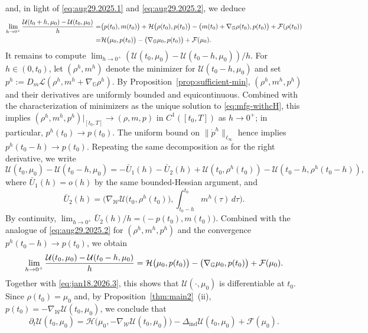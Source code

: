 \documentclass[10pt]{article}
\numberwithin{equation}{section}
\newcommand{\cF}{ \mathcal{F}}
\newcommand{\cH}{ \mathcal{H}}
\newcommand{\cL}{ \mathcal{L}}
\newcommand{\cU}{ \mathcal{U}}
\newcommand{\cW}{ \mathcal{W}}
\newcommand{\bG}{\mathbb G}
\def\cH{\mathcal{H}}
\def\cL{\mathcal{L}}
\begin{document}
and, in light of \eqref{eq:aug29.2025.1} and \eqref{eq:aug29.2025.2}, we deduce
\begin{align}\label{eq:jan18.2026.3}
\lim_{h \to 0^+}{\cU(t_0+h,\mu_0)-\cU(t_0,\mu_0)\over h}=&\big(p(t_0), m(t_0)\big)+\cH\big(\rho(t_0), p(t_0)\big) - \big( m(t_0)+ \nabla_\bG \rho(t_0), p(t_0)\big) + \cF(\rho(t_0))\nonumber\\
= &\cH\big(\mu_0, p(t_0)\big)- \big( \nabla_\bG \mu_0, p(t_0)\big)+ \cF(\mu_0).
\end{align}
It remains to compute $\lim_{h \to 0^+}(\cU(t_0,\mu_0)-\cU(t_0-h,\mu_0))/h$. For $h \in (0, t_0)$, let $(\rho^h, m^h)$ denote the minimizer for $\cU(t_0-h, \mu_0)$ and set $p^h := D_m \cL(\rho^h, m^h + \nabla_\bG \rho^h)$. By Proposition~\ref{prop:sufficient-min}, $(\rho^h, m^h, p^h)$ and their derivatives are uniformly bounded and equicontinuous. Combined with the characterization of minimizers as the unique solution to \eqref{eq:mfg-withcH}, this implies $(\rho^h, m^h, p^h)|_{[t_0, T]} \to (\rho, m, p)$ in $C^1([t_0, T])$ as $h \to 0^+$; in particular, $p^h(t_0) \to p(t_0)$. The uniform bound on $\|\dot p^h\|_{\ell_\infty}$ hence implies $p^h(t_0-h) \to p(t_0)$.
Repeating the same decomposition as for the right derivative, we write
\[
\cU(t_0, \mu_0) - \cU(t_0-h, \mu_0) = -\bar U_1(h) -\bar U_2(h) + \cU(t_0, \rho^h(t_0)) - \cU(t_0-h, \rho^h(t_0-h)),
\]
where $\bar U_1(h) = o(h)$ by the same bounded-Hessian argument, and
\[
\bar U_2(h) = \Big(\nabla_\cW \cU\big(t_0, \rho^h(t_0)\big), \int_{t_0-h}^{t_0} m^h(\tau)\,d\tau\Big).
\]
By continuity, $\lim_{h \to 0^+} \bar U_2(h)/h = \big(-p(t_0), m(t_0)\big)$. Combined with the analogue of \eqref{eq:aug29.2025.2} for $(\rho^h, m^h, p^h)$ and the convergence $p^h(t_0-h) \to p(t_0)$, we obtain
\[
\lim_{h \to 0^+}{\cU(t_0 ,\mu_0)-\cU(t_0-h,\mu_0)\over h}  =  \cH\big(\mu_0, p(t_0)\big)- \big( \nabla_\bG \mu_0, p(t_0)\big)+ \cF(\mu_0).
\]
Together with \eqref{eq:jan18.2026.3}, this shows that $\cU(\cdot, \mu_0)$ is differentiable at $t_0$. Since $\rho(t_0)=\mu_0$ and, by Proposition~\ref{thm:main2}~(ii), $p(t_0)=-\nabla_{\cW}\cU(t_0, \mu_0)$, we conclude that
\begin{equation}\label{eq:aug30.2025.2}
\partial_t \cU(t_0, \mu_0)=  \cH\big(\mu_0, -\nabla_{\cW}\cU(t_0, \mu_0)\big)- \Delta_\text{ind}\cU(t_0,\mu_0) + \cF(\mu_0).
\end{equation} \endproof
\end{document}
